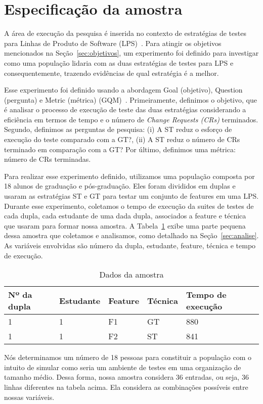 \section{Especifica\c{c}\~ao da amostra}
\label{sec:especificacao}


A área de execução da pesquisa é inserida no contexto de estratégias de testes para Linhas de Produto de Software (LPS)~\cite{pohl-book}. Para atingir os objetivos mencionados na Seção~\ref{sec:objetivos}, um experimento foi definido para investigar como uma população lidaria com as duas estratégias de testes para LPS e consequentemente, trazendo evidências de qual estratégia é a melhor.

Esse experimento foi definido usando a abordagem Goal (objetivo), Question (pergunta) e Metric (métrica) (GQM)~\cite{gqm}. Primeiramente, definimos o objetivo, que é analisar o processo de execução de teste das duas estratégias considerando a eficiência em termos de tempo e o número de \emph{Change Requests (CRs)} terminados. Segundo, definimos as perguntas de pesquisa: (i) A ST reduz o esforço de execução do teste comparado com a GT?, (ii) A ST reduz o número de CRs terminado em comparação com a GT? Por último, definimos uma métrica: número de CRs terminadas.

Para realizar esse experimento definido, utilizamos uma população composta por 18 alunos de graduação e pós-graduação. Eles foram divididos em duplas e usaram as estratégias ST e GT para testar um conjunto de features em uma LPS. Durante esse experimento, coletamos o tempo de execução da suites de testes de cada dupla, cada estudante de uma dada dupla, associados a feature e técnica que usaram para formar nossa amostra. A Tabela~\ref{tab:amostra} exibe uma parte pequena dessa amostra que coletamos e analisamos, como detalhado na Seção~\ref{sec:analise}. As variáveis envolvidas são número da dupla, estudante, feature, técnica e tempo de execução.

\begin{table}[h]\footnotesize
    \caption{Dados da amostra}
    \centering
    \begin{tabular}{|l|l|l|l|l|}
    \addlinespace
    \hline
    {\bf Nº da dupla}  & {\bf Estudante} & {\bf Feature} & {\bf Técnica} & {\bf Tempo de execução}\\ \hline
    1 & 1 & F1 & GT & 880\\ \hline
    1 & 1 & F2 & ST & 841\\ \hline
    \end{tabular}
  \label{tab:amostra}
\end{table}

Nós determinamos um número de 18 pessoas para constituir a população com o intuito de simular como seria um ambiente de testes em uma organização de tamanho médio. Dessa forma, nossa amostra considera 36 entradas, ou seja, 36 linhas diferentes na tabela acima. Ela considera as combinações possíveis entre nossas variáveis.

